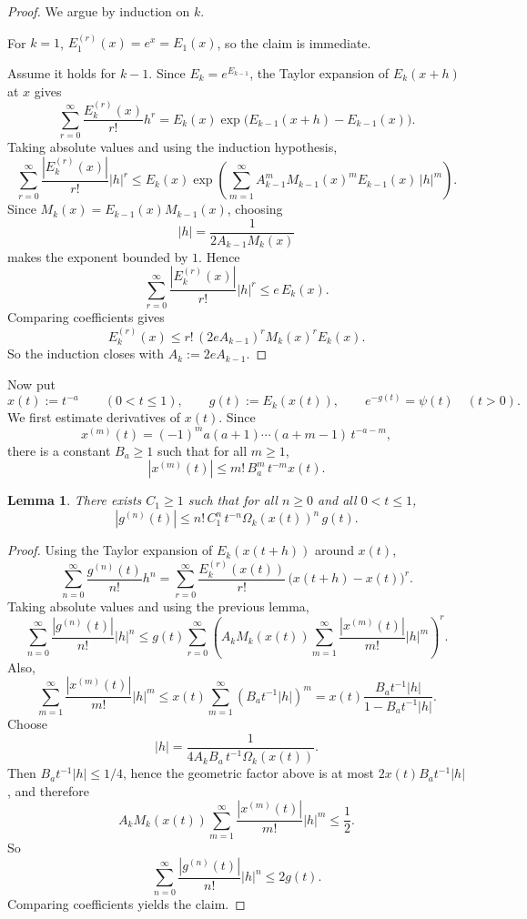 \documentclass[11pt]{amsart}
\newtheorem{lemma}[theorem]{Lemma}
\newcommand{\1}{{\rm 1\hspace*{-0.4ex}%
			\rule{0.1ex}{1.52ex}\hspace*{0.2ex}}}
\numberwithin{equation}{section}
\begin{document}
\begin{proof}
	We argue by induction on \(k\).
	
	For \(k=1\), \(E_1^{(r)}(x)=e^x=E_1(x)\), so the claim is immediate.
	
	Assume it holds for \(k-1\). Since \(E_k=e^{E_{k-1}}\), the Taylor expansion
	of \(E_k(x+h)\) at \(x\) gives
	\[
	\sum_{r=0}^\infty \frac{E_k^{(r)}(x)}{r!}h^r
	=
	E_k(x)\exp\!\bigl(E_{k-1}(x+h)-E_{k-1}(x)\bigr).
	\]
	Taking absolute values and using the induction hypothesis,
	\[
	\sum_{r=0}^\infty \frac{|E_k^{(r)}(x)|}{r!}|h|^r
	\le
	E_k(x)\exp\!\left(
	\sum_{m=1}^\infty A_{k-1}^m M_{k-1}(x)^m E_{k-1}(x)\,|h|^m
	\right).
	\]
	Since \(M_k(x)=E_{k-1}(x)M_{k-1}(x)\), choosing
	\[
	|h|=\frac1{2A_{k-1}M_k(x)}
	\]
	makes the exponent bounded by \(1\). Hence
	\[
	\sum_{r=0}^\infty \frac{|E_k^{(r)}(x)|}{r!}|h|^r \le e\,E_k(x).
	\]
	Comparing coefficients gives
	\[
	E_k^{(r)}(x)\le r!\,(2eA_{k-1})^r M_k(x)^r E_k(x).
	\]
	So the induction closes with \(A_k:=2eA_{k-1}\).
\end{proof}

Now put
\[
x(t):=t^{-a}\qquad (0<t\le 1),
\qquad
g(t):=E_k(x(t)),
\qquad
e^{-g(t)}=\psi(t)\quad (t>0).
\]
We first estimate derivatives of \(x(t)\). Since
\[
x^{(m)}(t)=(-1)^m a(a+1)\cdots (a+m-1)\,t^{-a-m},
\]
there is a constant \(B_a\ge 1\) such that for all \(m\ge 1\),
\[
|x^{(m)}(t)|\le m!\,B_a^m\,t^{-m}x(t).
\]

\begin{lemma}
	There exists \(C_1\ge 1\) such that for all \(n\ge 0\) and all \(0<t\le 1\),
	\[
	|g^{(n)}(t)|\le n!\,C_1^n\,t^{-n}\Omega_k(x(t))^n\,g(t).
	\]
\end{lemma}

\begin{proof}
	Using the Taylor expansion of \(E_k(x(t+h))\) around \(x(t)\),
	\[
	\sum_{n=0}^\infty \frac{g^{(n)}(t)}{n!}h^n
	=
	\sum_{r=0}^\infty \frac{E_k^{(r)}(x(t))}{r!}\,
	\bigl(x(t+h)-x(t)\bigr)^r .
	\]
	Taking absolute values and using the previous lemma,
	\[
	\sum_{n=0}^\infty \frac{|g^{(n)}(t)|}{n!}|h|^n
	\le
	g(t)\sum_{r=0}^\infty
	\left(
	A_k M_k(x(t))
	\sum_{m=1}^\infty \frac{|x^{(m)}(t)|}{m!}|h|^m
	\right)^r .
	\]
	Also,
	\[
	\sum_{m=1}^\infty \frac{|x^{(m)}(t)|}{m!}|h|^m
	\le
	x(t)\sum_{m=1}^\infty (B_a t^{-1}|h|)^m
	=
	x(t)\frac{B_a t^{-1}|h|}{1-B_a t^{-1}|h|}.
	\]
	Choose
	\[
	|h|=\frac1{4A_kB_a\,t^{-1}\Omega_k(x(t))}.
	\]
	Then \(B_a t^{-1}|h|\le 1/4\), hence the geometric factor above is at most
	\(2x(t)B_a t^{-1}|h|\), and therefore
	\[
	A_kM_k(x(t))
	\sum_{m=1}^\infty \frac{|x^{(m)}(t)|}{m!}|h|^m
	\le \frac12 .
	\]
	So
	\[
	\sum_{n=0}^\infty \frac{|g^{(n)}(t)|}{n!}|h|^n \le 2g(t).
	\]
	Comparing coefficients yields the claim.
\end{proof}
\end{document}
